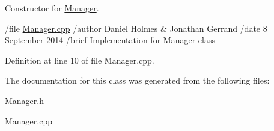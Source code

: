 Constructor for \hyperlink{class_manager}{Manager}. 

/file \hyperlink{_manager_8cpp_source}{Manager.\+cpp} /author Daniel Holmes \& Jonathan Gerrand /date 8 September 2014 /brief Implementation for \hyperlink{class_manager}{Manager} class 

Definition at line 10 of file Manager.\+cpp.



The documentation for this class was generated from the following files\+:\begin{DoxyCompactItemize}
\item 
\hyperlink{_manager_8h}{Manager.\+h}\item 
Manager.\+cpp\end{DoxyCompactItemize}
